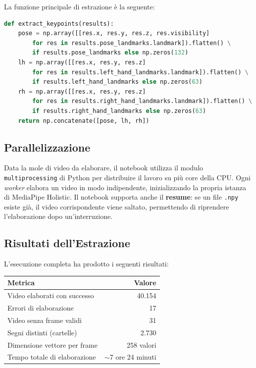 La funzione principale di estrazione è la seguente:

\begin{lstlisting}[language=Python, caption={Funzione di estrazione dei landmark da un singolo frame}]
def extract_keypoints(results):
    pose = np.array([[res.x, res.y, res.z, res.visibility]
        for res in results.pose_landmarks.landmark]).flatten() \
        if results.pose_landmarks else np.zeros(132)
    lh = np.array([[res.x, res.y, res.z]
        for res in results.left_hand_landmarks.landmark]).flatten() \
        if results.left_hand_landmarks else np.zeros(63)
    rh = np.array([[res.x, res.y, res.z]
        for res in results.right_hand_landmarks.landmark]).flatten() \
        if results.right_hand_landmarks else np.zeros(63)
    return np.concatenate([pose, lh, rh])
\end{lstlisting}

\subsection{Parallelizzazione}

Data la mole di video da elaborare, il notebook utilizza il modulo \texttt{multiprocessing} di Python per distribuire il lavoro su più core della CPU. Ogni \textit{worker} elabora un video in modo indipendente, inizializzando la propria istanza di MediaPipe Holistic. Il notebook supporta anche il \textbf{resume}: se un file \texttt{.npy} esiste già, il video corrispondente viene saltato, permettendo di riprendere l'elaborazione dopo un'interruzione.

\subsection{Risultati dell'Estrazione}

L'esecuzione completa ha prodotto i seguenti risultati:

\begin{center}
\begin{tabular}{lr}
\hline
\textbf{Metrica} & \textbf{Valore} \\
\hline
Video elaborati con successo & 40.154 \\
Errori di elaborazione & 17 \\
Video senza frame validi & 31 \\
Segni distinti (cartelle) & 2.730 \\
Dimensione vettore per frame & 258 valori \\
Tempo totale di elaborazione & $\sim$7 ore 24 minuti \\
\hline
\end{tabular}
\end{center}

